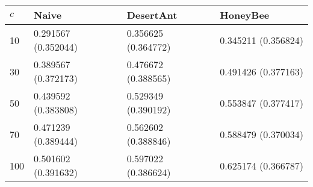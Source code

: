 \begin{tabular} {|l|l|l|l|}
\hline
$c$ & Naive & DesertAnt & HoneyBee \\
\hline
10 & 0.291567 (0.352044)  & 0.356625 (0.364772)  & 0.345211 (0.356824)  \\
30 & 0.389567 (0.372173)  & 0.476672 (0.388565)  & 0.491426 (0.377163)  \\
50 & 0.439592 (0.383808)  & 0.529349 (0.390192)  & 0.553847 (0.377417)  \\
70 & 0.471239 (0.389444)  & 0.562602 (0.388846)  & 0.588479 (0.370034)  \\
100 & 0.501602 (0.391632)  & 0.597022 (0.386624)  & 0.625174 (0.366787)  \\
\hline
\end{tabular}
